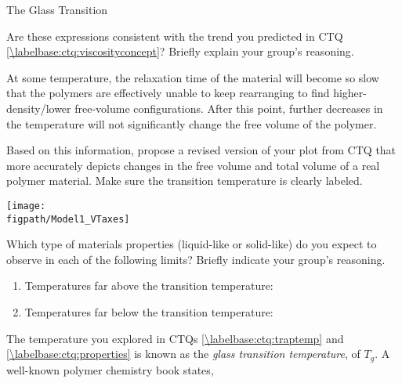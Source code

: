 \begin{activity}{The Glass Transition}
\begin{infobox}
\end{infobox}

\begin{ctqs}
		
	\question Are these expressions consistent with the trend you predicted in CTQ \ref{\labelbase:ctq:viscosityconcept}?  Briefly explain your group's reasoning.
			
				\begin{solution}[1in]
				\end{solution}
	
	\clearpage
	\question At some temperature, the relaxation time of the material will become so slow that the polymers are effectively unable to keep rearranging to find higher-density/lower free-volume configurations.  After this point, further decreases in the temperature will not significantly change the free volume of the polymer. \label{\labelbase:ctq:traptemp}
	
		Based on this information, propose a revised version of your plot from CTQ \label{\labelbase:ctq:VTplot1} that more accurately depicts changes in the free volume and total volume of a real polymer material.  Make sure the transition temperature is clearly labeled.
	
		\vspace{0.25in}
		\centerline{\texttt{[image: \\figpath/Model1\_VTaxes]}}
		
	\question Which type of materials properties (liquid-like or solid-like) do you expect to observe in each of the following limits?  Briefly indicate your group's reasoning. \label{\labelbase:ctq:properties}
	
		\begin{enumerate}
			\item Temperatures far above the transition temperature:
			
				\begin{solution}[0.5in]
				\end{solution}
			
			\item Temperatures far below the transition temperature:
			
				\begin{solution}[0.5in]
				\end{solution}
			
		\end{enumerate}
		
	\question The temperature you explored in CTQs \ref{\labelbase:ctq:traptemp} and \ref{\labelbase:ctq:properties} is known as the \emph{glass transition temperature}, of $T_g$.  A well-known polymer chemistry book states,
	

\end{ctqs}
\end{activity}

